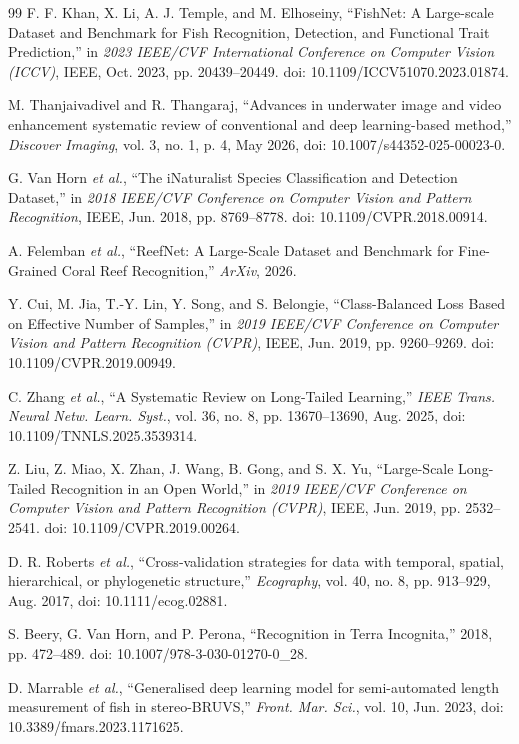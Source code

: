 \documentclass[preprint,12pt]{elsarticle}
\begin{document}
\begin{thebibliography}{99}
 F. F. Khan, X. Li, A. J. Temple, and M. Elhoseiny, ``FishNet: A
Large-scale Dataset and Benchmark for Fish Recognition, Detection, and
Functional Trait Prediction,'' in \emph{2023 IEEE/CVF International
Conference on Computer Vision (ICCV)}, IEEE, Oct. 2023, pp.
20439--20449. doi: 10.1109/ICCV51070.2023.01874.

 M. Thanjaivadivel and R. Thangaraj, ``Advances in underwater
image and video enhancement systematic review of conventional and deep
learning-based method,'' \emph{Discover Imaging}, vol. 3, no. 1, p. 4,
May 2026, doi: 10.1007/s44352-025-00023-0.

 G. Van Horn \emph{et al.}, ``The iNaturalist Species
Classification and Detection Dataset,'' in \emph{2018 IEEE/CVF
Conference on Computer Vision and Pattern Recognition}, IEEE, Jun. 2018,
pp. 8769--8778. doi: 10.1109/CVPR.2018.00914.

 A. Felemban \emph{et al.}, ``ReefNet: A Large-Scale Dataset and
Benchmark for Fine-Grained Coral Reef Recognition,'' \emph{ArXiv}, 2026.

 Y. Cui, M. Jia, T.-Y. Lin, Y. Song, and S. Belongie,
``Class-Balanced Loss Based on Effective Number of Samples,'' in
\emph{2019 IEEE/CVF Conference on Computer Vision and Pattern
Recognition (CVPR)}, IEEE, Jun. 2019, pp. 9260--9269. doi:
10.1109/CVPR.2019.00949.

 C. Zhang \emph{et al.}, ``A Systematic Review on Long-Tailed
Learning,'' \emph{IEEE Trans. Neural Netw. Learn. Syst.}, vol. 36, no.
8, pp. 13670--13690, Aug. 2025, doi: 10.1109/TNNLS.2025.3539314.

 Z. Liu, Z. Miao, X. Zhan, J. Wang, B. Gong, and S. X. Yu,
``Large-Scale Long-Tailed Recognition in an Open World,'' in \emph{2019
IEEE/CVF Conference on Computer Vision and Pattern Recognition (CVPR)},
IEEE, Jun. 2019, pp. 2532--2541. doi: 10.1109/CVPR.2019.00264.

 D. R. Roberts \emph{et al.}, ``Cross‐validation strategies for
data with temporal, spatial, hierarchical, or phylogenetic structure,''
\emph{Ecography}, vol. 40, no. 8, pp. 913--929, Aug. 2017, doi:
10.1111/ecog.02881.

 S. Beery, G. Van Horn, and P. Perona, ``Recognition in Terra
Incognita,'' 2018, pp. 472--489. doi: 10.1007/978-3-030-01270-0\_28.

 D. Marrable \emph{et al.}, ``Generalised deep learning model
for semi-automated length measurement of fish in stereo-BRUVS,''
\emph{Front. Mar. Sci.}, vol. 10, Jun. 2023, doi:
10.3389/fmars.2023.1171625.


\end{thebibliography}
\end{document}
